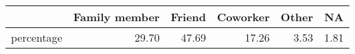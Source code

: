 \begin{table}[ht]
\centering
\begin{tabular}{rrrrrr}
  \hline
 & Family member & Friend & Coworker & Other & NA \\ 
  \hline
percentage & 29.70 & 47.69 & 17.26 & 3.53 & 1.81 \\ 
   \hline
\end{tabular}
\end{table}
